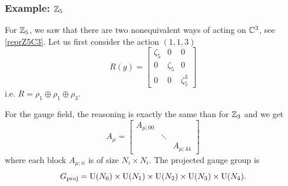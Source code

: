         \subsubsection{Example: $\mathbb{Z}_5$}

            For $\mathbb{Z}_5$, we saw that there are two nonequivalent ways of acting on $\mathbb{C}^3$, see \eqref{reprZ5C3}. Let us first consider the action $(1,1,3)$
            \begin{equation}
                R(g)=
                \begin{bmatrix}
                    \zeta_5 & 0 & 0\\
                    0 & \zeta_5 & 0\\
                    0 & 0 & \zeta^3_5
                \end{bmatrix}
            \end{equation}
            i.e. $R=\rho_1\oplus\rho_1\oplus\rho_3$.

            For the gauge field, the reasoning is exactly the same than for $\mathbb{Z}_3$ and we get
            \begin{equation}
                A_\mu=
                \begin{bmatrix}
                    A_{\mu;00} & & \\
                    & \ddots & \\
                    & & A_{\mu;44}
                \end{bmatrix}
            \end{equation}
            where each block $A_{\mu;ii}$ is of size $N_i\times N_i$. The projected gauge group is
            \begin{equation}
                G_{\text{proj}} = \text{U}(N_0)\times\text{U}(N_1)\times\text{U}(N_2)\times\text{U}(N_3)\times\text{U}(N_4).
            \end{equation}

